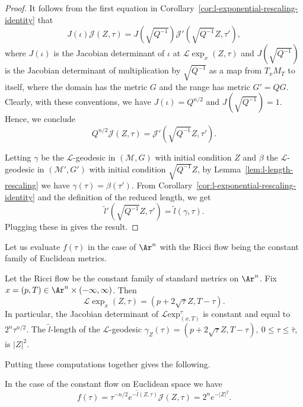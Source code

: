 \begin{proof}
\sketch
It follows from the first equation in Corollary~\ref{cor:l-exponential-rescaling-identity} that
$$J(\iota){\mathcal J}(Z,\tau)=J(\sqrt{Q^{-1}}){\mathcal
J}'(\sqrt{Q^{-1}}Z,\tau'),$$ where $J(\iota)$ is the Jacobian
determinant of $\iota$ at ${\mathcal L}\exp_x(Z,\tau)$ and
$J(\sqrt{Q^{-1}})$ is the Jacobian determinant of multiplication by
$\sqrt{Q^{-1}}$ as a map from $T_xM_T$ to itself, where the domain
has the metric $G$ and the range has metric $G'=QG$. Clearly, with
these conventions, we have $J(\iota)=Q^{n/2}$ and
$J(\sqrt{Q^{-1}})=1$. Hence, we conclude
$$Q^{n/2}{\mathcal J}(Z,\tau)={\mathcal J}'(\sqrt{Q^{-1}}Z,\tau').$$

Letting $\gamma$ be the ${\mathcal L}$-geodesic in $({\mathcal
M},G)$ with initial condition $Z$ and $\beta$ the ${\mathcal
L}$-geodesic in $({\mathcal M}',G')$ with initial condition
$\sqrt{Q^{-1}}Z$,  by Lemma~\ref{lem:l-length-rescaling} we have
$\gamma(\tau)=\beta(\tau')$. From Corollary~\ref{cor:l-exponential-rescaling-identity} and the
definition of the reduced length, we get $$\tilde
l'(\sqrt{Q^{-1}}Z,\tau')=\tilde l(\gamma,\tau).$$ Plugging these in
gives the result.
\end{proof}

Let us evaluate $f(\tau)$ in the case of $\Ar^n$ with the Ricci flow being the
constant family of Euclidean metrics.

\begin{example}\label{ex:l-exponential-euclidean}
Let the Ricci flow be the constant family of standard metrics on
$\Ar^n$. Fix $x=(p,T)\in \Ar ^n\times (-\infty,\infty)$. Then
$${\mathcal L}\exp_x(Z,\tau)=(p+2\sqrt{\tau}Z,T-\tau).$$
In particular, the Jacobian determinant of ${\mathcal L}\mathrm{exp}_{(x,T)}^\tau$ is constant and equal to $2^n\tau^{n/2}$. The
$\widetilde l$-length of the ${\mathcal L}$-geodesic
$\gamma_Z(\tau)=(p+2\sqrt{\tau}Z, T-\tau),\ 0\le \tau\le \bar\tau$,
is $|Z|^2$.
\end{example}

Putting these computations together gives the following.

\begin{claim}\label{claim:reduced-volume-integrand-euclidean}
\label{Arnquantity}
In the case of the constant flow on Euclidean space we have
$$f(\tau)=\tau^{-n/2}e^{-\tilde l(Z,\tau)}{\mathcal J}(Z,\tau)=2^ne^{-|Z|^2}.$$
\end{claim}

